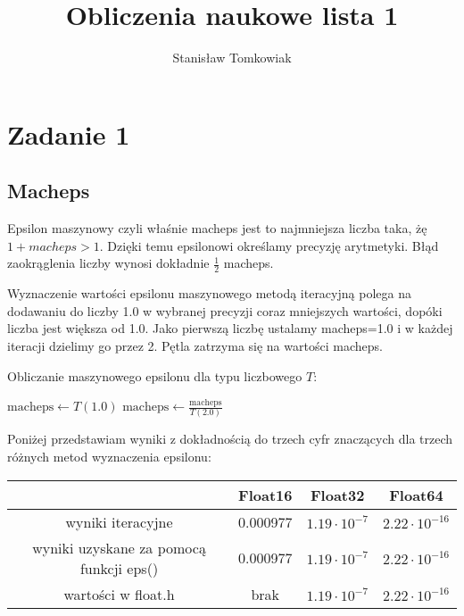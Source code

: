 \documentclass{article}
\title{Obliczenia naukowe lista 1}
\author{Stanisław Tomkowiak}
\begin{document}
\maketitle



\section*{Zadanie 1}
\subsection*{Macheps}

Epsilon maszynowy czyli właśnie macheps jest to najmniejsza liczba taka, żę $1+macheps >1 $. Dzięki temu epsilonowi określamy precyzję arytmetyki. Błąd zaokrąglenia liczby wynosi dokładnie $\frac{1}{2}$ macheps.

Wyznaczenie wartości epsilonu maszynowego metodą iteracyjną polega na dodawaniu do liczby 1.0 w wybranej precyzji coraz mniejszych wartości, dopóki liczba jest większa od 1.0. Jako pierwszą liczbę ustalamy macheps=1.0 i w każdej iteracji dzielimy go przez 2. Pętla zatrzyma się na wartości macheps.


\begin{algorithm}
\caption{Obliczanie maszynowego epsilonu dla typu liczbowego \( T \):}
\begin{algorithmic}[1]
    \State \( \text{macheps} \gets T(1.0) \) 
        \State \( \text{macheps} \gets \frac{\text{macheps}}{T(2.0)} \) 
    \EndWhile
    \State \Return {} 
\EndFunction
\end{algorithmic}
\end{algorithm}

Poniżej przedstawiam wyniki z dokładnością do trzech cyfr znaczących dla trzech różnych metod wyznaczenia epsilonu:
\begin{center}
  \begin{tabular}{|c|c|c|c|}
    \hline
            & Float16   & Float32    & Float64   \\ [0.5ex]
    \hline
    wyniki iteracyjne& 0.000977& $1.19 \cdot 10^{-7}$ & $2.22 \cdot 10^{-16}$ \\
    \hline
    wyniki uzyskane za pomocą funkcji eps() & 0.000977& $1.19 \cdot 10^{-7}$ & $2.22 \cdot 10^{-16}$ \\
    \hline
    wartości w float.h   & brak & $1.19 \cdot 10^{-7}$ & $2.22 \cdot 10^{-16}$ \\
    \hline
  \end{tabular}
\end{center}
\end{document}
